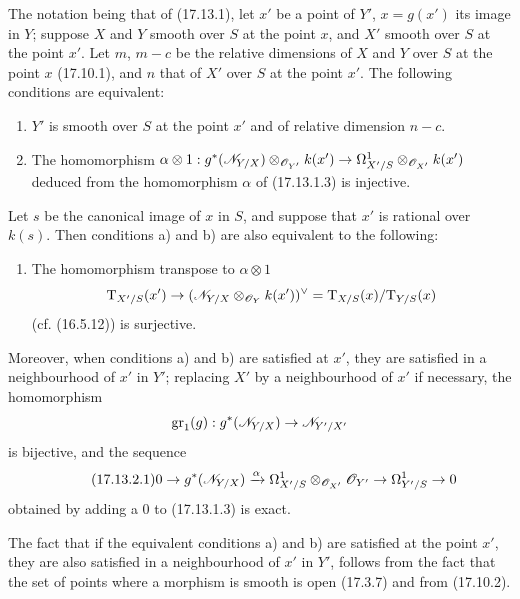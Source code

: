 \begin{proposition}[17.13.2]
\label{IV.17.13.2}
The notation being that of (17.13.1), let $x'$ be a point of $Y'$, $x=g(x')$ its image in $Y$; suppose $X$ and $Y$ smooth over $S$ at the point $x$, and $X'$ smooth over $S$ at the point $x'$. Let $m$, $m-c$ be the relative dimensions of $X$ and $Y$ over $S$ at the point $x$ (17.10.1), and $n$ that of $X'$ over $S$ at the point $x'$. The following conditions are equivalent:
\begin{enumerate}
  \item[a)] $Y'$ is smooth over $S$ at the point $x'$ and of relative dimension $n-c$.
  \item[b)] The homomorphism $\alpha\otimes1:g^*(\mathscr{N}_{Y/X})\otimes_{\mathscr{O}_{Y'}}k(x')\to\Omega^1_{X'/S}\otimes_{\mathscr{O}_{X'}}k(x')$ deduced from the homomorphism $\alpha$ of (17.13.1.3) is injective.
\end{enumerate}
Let $s$ be the canonical image of $x$ in $S$, and suppose that $x'$ is rational over $k(s)$. Then conditions a) and b) are also equivalent to the following:
\begin{enumerate}
  \item[b')] The homomorphism transpose to $\alpha\otimes1$
  \[
  \mathrm{T}_{X'/S}(x')\to(\mathscr{N}_{Y/X}\otimes_{\mathscr{O}_Y}k(x'))^\vee=\mathrm{T}_{X/S}(x)/\mathrm{T}_{Y/S}(x)
  \]
  (cf. (16.5.12)) is surjective.
\end{enumerate}
Moreover, when conditions a) and b) are satisfied at $x'$, they are satisfied in a neighbourhood of $x'$ in $Y'$; replacing $X'$ by a neighbourhood of $x'$ if necessary, the homomorphism
\[
\operatorname{gr}_1(g):g^*(\mathscr{N}_{Y/X})\to\mathscr{N}_{Y'/X'}
\]
is bijective, and the sequence
\[
\label{IV.17.13.2.1}
\tag{17.13.2.1}
0\to g^*(\mathscr{N}_{Y/X})\xrightarrow{\alpha}\Omega^1_{X'/S}\otimes_{\mathscr{O}_{X'}}\mathscr{O}_{Y'}\to\Omega^1_{Y'/S}\to0
\]
obtained by adding a $0$ to (17.13.1.3) is exact.
\end{proposition}

The fact that if the equivalent conditions a) and b) are satisfied at the point $x'$, they are also satisfied in a neighbourhood of $x'$ in $Y'$, follows from the fact that the set of points where a morphism is smooth is open (17.3.7) and from (17.10.2).

